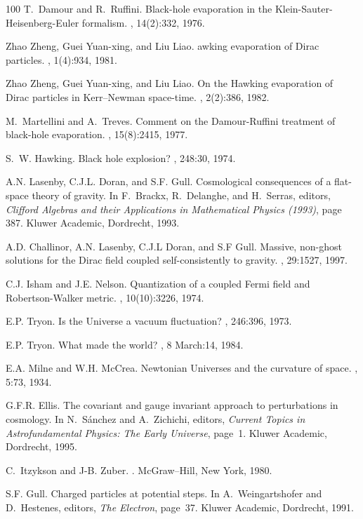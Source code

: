 \documentclass[a4paper]{article}
\numberwithin{equation}{section}
\begin{document}
\begin{thebibliography}{100}
T.~Damour and R.~Ruffini.
\newblock Black-hole evaporation in the {K}lein-{S}auter-{H}eisenberg-{E}uler
  formalism.
, 14(2):332, 1976.

{Zhao Zheng}, {Guei Yuan-xing}, and {Liu Liao}.
awking evaporation of {D}irac particles.
, 1(4):934, 1981.

{Zhao Zheng}, {Guei Yuan-xing}, and {Liu Liao}.
\newblock On the {H}awking evaporation of {D}irac particles in {K}err--{N}ewman
  space-time.
, 2(2):386, 1982.

M.~Martellini and A.~Treves.
\newblock Comment on the {D}amour-{R}uffini treatment of black-hole
  evaporation.
, 15(8):2415, 1977.

S.~W. Hawking.
\newblock Black hole explosion?
, 248:30, 1974.

A.N. Lasenby, C.J.L. Doran, and S.F. Gull.
\newblock Cosmological consequences of a flat-space theory of gravity.
\newblock In F.~Brackx, R.~Delanghe, and H.~Serras, editors, {\em Clifford
  Algebras and their Applications in Mathematical Physics (1993)}, page 387.
  Kluwer Academic, Dordrecht, 1993.

A.D. Challinor, A.N. Lasenby, C.J.L Doran, and S.F Gull.
\newblock Massive, non-ghost solutions for the {D}irac field coupled
  self-consistently to gravity.
, 29:1527, 1997.

C.J. Isham and J.E. Nelson.
\newblock Quantization of a coupled {F}ermi field and {R}obertson-{W}alker
  metric.
, 10(10):3226, 1974.

E.P. Tryon.
\newblock Is the {U}niverse a vacuum fluctuation?
, 246:396, 1973.

E.P. Tryon.
\newblock What made the world?
, 8 March:14, 1984.

E.A. Milne and W.H. Mc{C}rea.
\newblock Newtonian {U}niverses and the curvature of space.
, 5:73, 1934.

G.F.R. Ellis.
\newblock The covariant and gauge invariant approach to perturbations in
  cosmology.
\newblock In N.~S{\'{a}}nchez and A.~Zichichi, editors, {\em Current Topics in
  Astrofundamental Physics: The Early Universe}, page~1. Kluwer Academic,
  Dordrecht, 1995.

C.~Itzykson and J-B. Zuber.
.
\newblock McGraw--Hill, New York, 1980.

S.F. Gull.
\newblock Charged particles at potential steps.
\newblock In A.~Weingartshofer and D.~Hestenes, editors, {\em The Electron},
  page~37. Kluwer Academic, Dordrecht, 1991.

\end{thebibliography}
\end{document}
